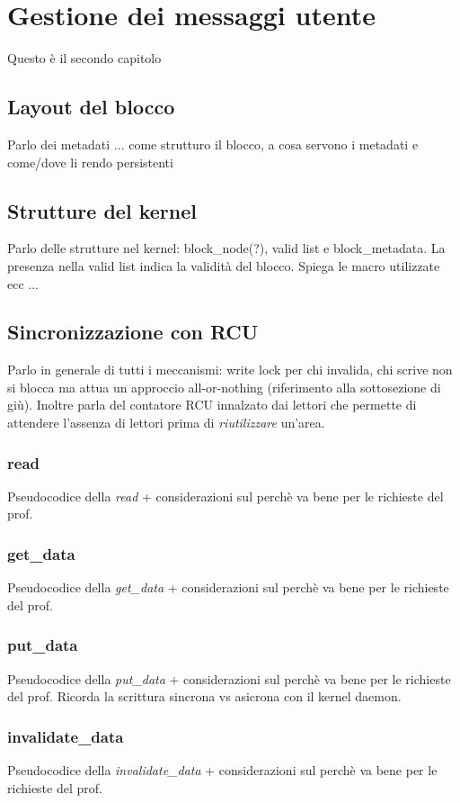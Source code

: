 \documentclass[a4paper,12pt,oneside]{book}
\begin{document}
	\chapter{Gestione dei messaggi utente}
	Questo è il secondo capitolo
	
	\section{Layout del blocco}
	Parlo dei metadati ... come strutturo il blocco, a cosa servono i metadati e come/dove li rendo persistenti	
	
	\section{Strutture del kernel}
	Parlo delle strutture nel kernel: block\_node(?), valid list e block\_metadata. La presenza nella valid list indica la validità del blocco. Spiega le macro utilizzate ecc ...

	\section{Sincronizzazione con RCU}
	Parlo in generale di tutti i meccanismi: write lock per chi invalida, chi scrive non si blocca ma attua un approccio all-or-nothing (riferimento alla sottosezione di giù). Inoltre parla del contatore RCU innalzato dai lettori che permette di attendere l'assenza di lettori prima di \emph{riutilizzare} un'area.

	\subsection{read}
	Pseudocodice della \emph{read} + considerazioni sul perchè va bene per le richieste del prof.
	\subsection{get\_data}
	Pseudocodice della \emph{get\_data} + considerazioni sul perchè va bene per le richieste del prof.
	\subsection{put\_data}
	Pseudocodice della \emph{put\_data} + considerazioni sul perchè va bene per le richieste del prof. Ricorda la scrittura sincrona vs asicrona con il kernel daemon.
	\subsection{invalidate\_data}
	Pseudocodice della \emph{invalidate\_data} + considerazioni sul perchè va bene per le richieste del prof.		
		
\end{document}
